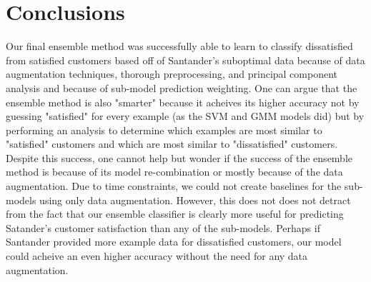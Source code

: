 \documentclass[11pt]{article}
\begin{document}
\section{Conclusions}

Our final ensemble method was successfully able to learn to classify 
dissatisfied from satisfied customers based off of Santander's suboptimal data 
because of data augmentation techniques, thorough preprocessing, and 
principal component analysis and because of sub-model prediction weighting.
One can argue that the ensemble method is also "smarter" because it acheives 
its higher accuracy not by guessing "satisfied" for every example (as the 
SVM and GMM models did) but by performing an analysis to determine which 
examples are most similar to "satisfied" customers and which are most similar 
to "dissatisfied" customers. Despite this success, one cannot help but wonder 
if the success of the ensemble method is because of its model re-combination 
or mostly because of the data augmentation. Due to time constraints, we could 
not create baselines for the sub-models using only data augmentation. 
However, this does not does not detract from the fact that our ensemble 
classifier is clearly more useful for predicting Satander's customer 
satisfaction than any of the sub-models. Perhaps if Santander provided more example data for dissatisfied customers, our model could acheive an even 
higher accuracy without the need for any data augmentation.
\end{document}
